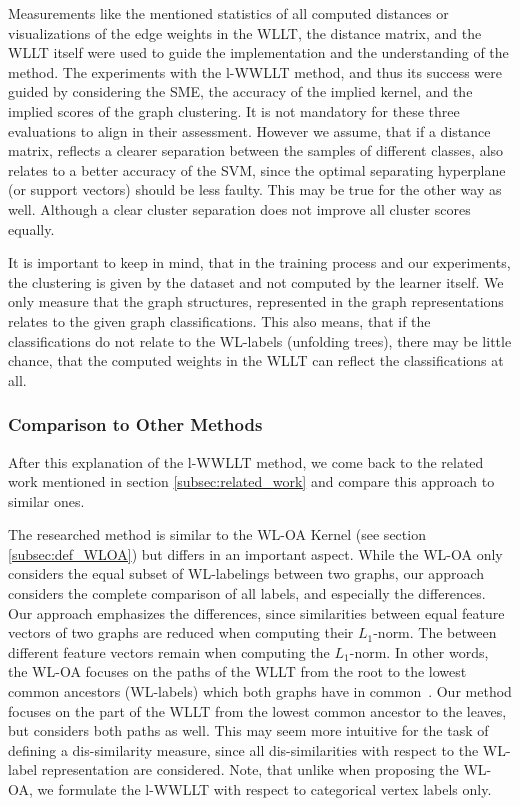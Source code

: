 		Measurements like the mentioned statistics of all computed distances or visualizations of the edge weights in the WLLT, the distance matrix, and the WLLT itself were used to guide the implementation and the understanding of the method.
		The experiments with the l-WWLLT method, and thus its success were guided by considering the SME, the accuracy of the implied kernel, and the implied scores of the graph clustering.		
		It is not mandatory for these three evaluations to align in their assessment. %
		However we assume, that if a distance matrix, reflects a clearer separation between the samples of different classes, also relates to a better accuracy of the SVM, since the optimal separating hyperplane (or support vectors) should be less faulty.
		This may be true for the other way as well. 
		Although a clear cluster separation does not improve all cluster scores equally.
			
		It is important to keep in mind, that in the training process and our experiments, the clustering is given by the dataset and not computed by the learner itself.
		We only measure that the graph structures, represented in the graph representations relates to the given graph classifications.
		This also means, that if the classifications do not relate to the WL-labels (unfolding trees), there may be little chance, that the computed weights in the WLLT can reflect the classifications at all.		
	
	\subsubsection{Comparison to Other Methods} \label{subsec:comparison_to_other_methods}
					
		After this explanation of the l-WWLLT method, we come back to the related work mentioned in section \ref{subsec:related_work} and compare this approach to similar ones.

		The researched method is similar to the WL-OA Kernel (see section \ref{subsec:def_WLOA}) but differs in an important aspect.
		While the WL-OA only considers the equal subset of WL-labelings between two graphs, our approach considers the complete comparison of all labels, and especially the differences.
		Our approach emphasizes the differences, since similarities between equal feature vectors of two graphs are reduced when computing their $L_1$-norm.
		The between different feature vectors remain when computing the $L_1$-norm.
		In other words, the WL-OA focuses on the paths of the WLLT from the root to the lowest common ancestors (WL-labels) which both graphs have in common~\cite{2016_Kriege_NIPS}.		
		Our method focuses on the part of the WLLT from the lowest common ancestor to the leaves, but considers both paths as well.
		This may seem more intuitive for the task of defining a dis-similarity measure, since all dis-similarities with respect to the WL-label representation are considered.
		Note, that unlike \citeauthor{2016_Kriege_NIPS} when proposing the WL-OA, we formulate the l-WWLLT with respect to categorical vertex labels only.
				
